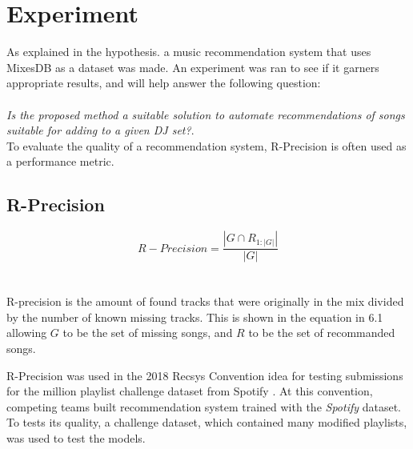 
\graphicspath{{Chapter5/}}


\chapter{Experiment}


As explained in the hypothesis. a music recommendation system that uses MixesDB as a dataset was made. An experiment was ran to see if it garners appropriate results, and will help answer the following question:
\\
\\
\textit{Is the proposed method a suitable solution to automate recommendations of songs suitable for adding to a given DJ set?}.
\\

To evaluate the quality of a recommendation system, R-Precision is often used as a performance metric. 
\\

\section{R-Precision}

\begin{equation}
	R-Precision = \frac{|G\cap R_{1:|G|}|}{|G|}
\end{equation}
\\\\
R-precision is the amount of found tracks that were originally in the mix divided by the number of known missing tracks. This is shown in the equation in 6.1 allowing $G$ to be the set of missing songs, and $R$ to be the set of recommanded songs.

R-Precision was used in the 2018 Recsys Convention idea for testing submissions for the million playlist challenge dataset from Spotify \citep{aicrowd_aicrowd_2023}. At this convention, competing teams built recommendation system trained with the \textit{Spotify} dataset. To tests its quality, a challenge dataset, which contained many modified playlists, was used to test the models.

